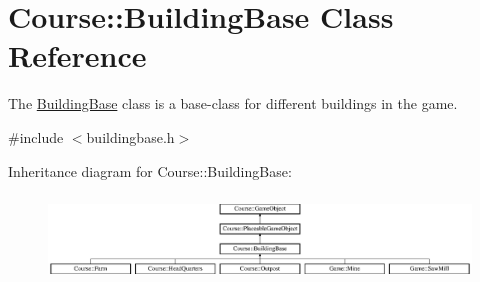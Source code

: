 \hypertarget{classCourse_1_1BuildingBase}{\section{Course\-:\-:Building\-Base Class Reference}
\label{classCourse_1_1BuildingBase}
}


The \hyperlink{classCourse_1_1BuildingBase}{Building\-Base} class is a base-\/class for different buildings in the game.  




{\ttfamily \#include $<$buildingbase.\-h$>$}

Inheritance diagram for Course\-:\-:Building\-Base\-:\begin{figure}[H]
\begin{center}
\leavevmode
\includegraphics[height=2.333333cm]{classCourse_1_1BuildingBase}
\end{center}
\end{figure}
